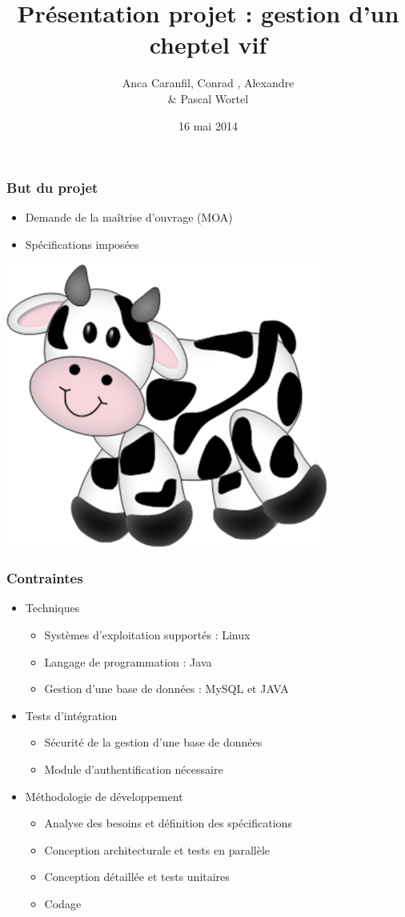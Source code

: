 \documentclass[handout]{beamer}
\title{Présentation projet : gestion d'un cheptel vif}
\author{Anca Caranfil, Conrad \bsc{Hillairet}, Alexandre \bsc{Vieira} \\ \& Pascal Wortel}
\institute{INSA de Rouen}
\date{16 mai 2014}
\begin{document}
\begin{frame}
\titlepage
\end{frame}

\begin{frame}
	\frametitle{But du projet}
	\begin{itemize}
		\item Demande de la maîtrise d'ouvrage (MOA)
		\item Spécifications imposées
	\end{itemize}	
	\begin{center}\includegraphics[scale=0.3]{ddb64d86.png}\end{center}
\end{frame}

\begin{frame}
	\frametitle{Contraintes}
	\begin{itemize}
		\item Techniques
		\begin{itemize}
			\item Systèmes d'exploitation supportés : Linux
			\item Langage de programmation : Java
			\item Gestion d'une base de données : MySQL et JAVA
		\end{itemize}
		\item Tests d'intégration
		\begin{itemize}
			\item  Sécurité de la gestion d'une base de données
			\item  Module d'authentification nécessaire
		\end{itemize}
		\item Méthodologie de développement
		\begin{itemize}
			\item Analyse des besoins et définition des spécifications
			\item Conception architecturale et tests en parallèle
			\item Conception détaillée et tests unitaires
			\item Codage
		\end{itemize}
	\end{itemize}
\end{frame}
\end{document}
